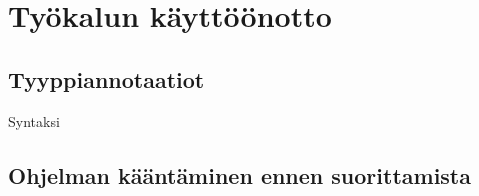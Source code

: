 \chapter{Työkalun käyttöönotto}

\section{Tyyppiannotaatiot}
Syntaksi

\section{Ohjelman kääntäminen ennen suorittamista}

